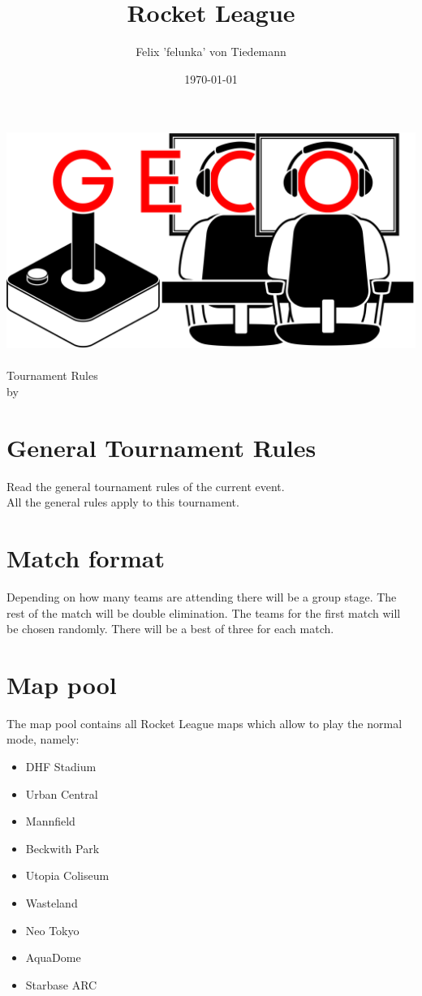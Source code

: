 \documentclass{article}
\title{Rocket League}
\author{Felix 'felunka' von Tiedemann}
\date{\today}
\begin{document}
\makeatletter
\begin{titlepage}
\centering
\includegraphics[scale=0.075]{GECo.png}\\
\LARGE \@title\\ Tournament Rules\\ \normalsize by \@author\\ \@date
\end{titlepage}
\makeatother


\clearpage

\tableofcontents
\clearpage

\section{General Tournament Rules}
Read the general tournament rules of the current event.\\
All the general rules apply to this tournament.

\section{Match format}
Depending on how many teams are attending there will be a group stage. The rest of the match will
be double elimination. The teams for the first match will be chosen randomly. There will be a best of
three for each match.

\section{Map pool}
The map pool contains all Rocket League maps which allow to play the normal mode, namely:
\begin{itemize}
  \item DHF Stadium
  \item Urban Central
  \item Mannfield
  \item Beckwith Park
  \item Utopia Coliseum
  \item Wasteland
  \item Neo Tokyo
  \item AquaDome
  \item Starbase ARC
\end{itemize}
\end{document}
